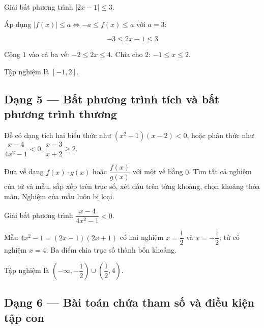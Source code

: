 \documentclass[11pt, a4paper]{article}
\begin{document}
\begin{vidu}[{4}]
Giải bất phương trình $|2x - 1| \le 3$.

Áp dụng $|f(x)| \le a \iff -a \le f(x) \le a$ với $a = 3$:

$$-3 \le 2x - 1 \le 3$$

Cộng $1$ vào cả ba vế: $-2 \le 2x \le 4$. Chia cho $2$: $-1 \le x \le 2$.

Tập nghiệm là $[-1, 2]$.

\end{vidu}
\subsection{Dạng 5 — Bất phương trình tích và bất phương trình thương}

 Đề có dạng tích hai biểu thức như $(x^2 - 1)(x - 2) < 0$, hoặc phân thức như $\dfrac{x - 4}{4x^2 - 1} < 0$, $\dfrac{x - 3}{x + 2} \ge 2$.

 Đưa về dạng $f(x) \cdot g(x)$ hoặc $\dfrac{f(x)}{g(x)}$ với một vế bằng $0$. Tìm tất cả nghiệm của tử và mẫu, sắp xếp trên trục số, xét dấu trên từng khoảng, chọn khoảng thỏa mãn. Nghiệm của mẫu luôn bị loại.

\begin{vidu}[{5}]
Giải bất phương trình $\dfrac{x - 4}{4x^2 - 1} < 0$.

Mẫu $4x^2 - 1 = (2x-1)(2x+1)$ có hai nghiệm $x = \dfrac{1}{2}$ và $x = -\dfrac{1}{2}$; tử có nghiệm $x = 4$. Ba điểm chia trục số thành bốn khoảng.


Tập nghiệm là $\left(-\infty, -\dfrac{1}{2}\right) \cup \left(\dfrac{1}{2}, 4\right)$.

\end{vidu}
\subsection{Dạng 6 — Bài toán chứa tham số và điều kiện tập con}
\end{document}
